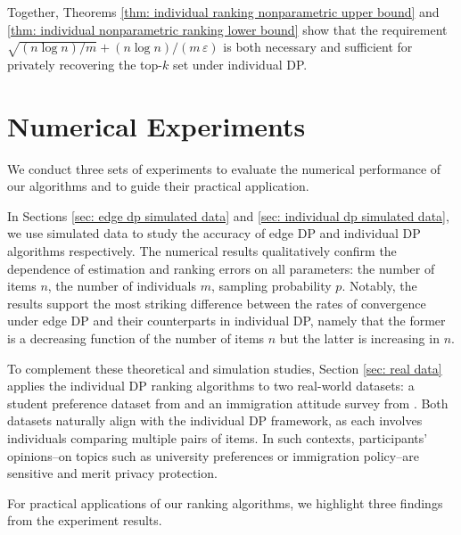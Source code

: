 \documentclass[letterpaper,12pt]{article}
\numberwithin{equation}{section}
\theoremstyle{plain}
\numberwithin{Theorem}{section}
\numberwithin{corollary}{section}
\numberwithin{proposition}{section}
\numberwithin{Lemma}{section}
{
	\theoremstyle{definition}
	\newtheorem{Definition}{Definition}
	\newtheorem{example}{Example}
	\numberwithin{example}{section}
	\newtheorem{fact}{Fact}
	\numberwithin{fact}{section}
	\newtheorem{remark}{Remark}
}
\newcommand{\1}{\mathbbm{1}}
\begin{document}
Together, Theorems \ref{thm: individual ranking nonparametric upper bound} and \ref{thm: individual nonparametric ranking lower bound} show that the requirement 
\(\sqrt{(n\log n)/m}+(n\log n)/(m\,\varepsilon)\)
is both necessary and sufficient for privately recovering the top-\(k\) set under individual DP. 
\vspace{-5mm}
\section{Numerical Experiments}
\label{sec: experiments}

We conduct three sets of experiments to evaluate the numerical performance of our algorithms and to guide their practical application.

In Sections \ref{sec: edge dp simulated data} and \ref{sec: individual dp simulated data}, we use simulated data to study the accuracy of edge DP and individual DP algorithms respectively. The numerical results qualitatively confirm the dependence of estimation and ranking errors on all parameters: the number of items $n$, the number of individuals $m$,  sampling probability $p$. Notably, the results support the most striking difference between the rates of convergence under edge DP and their counterparts in individual DP, namely that the former is a decreasing function of the number of items $n$ but the latter is increasing in $n$.

To complement these theoretical and simulation studies, Section \ref{sec: real data} applies the individual DP ranking algorithms to two real-world datasets: a student preference dataset from \cite{dittrich1998modelling} and an immigration attitude survey from \cite{weber2011novel}. Both datasets naturally align with the individual DP framework, as each involves individuals comparing multiple pairs of items. In such contexts, participants' opinions--on topics such as university preferences or immigration policy--are sensitive and merit privacy protection.

For practical applications of our ranking algorithms, we highlight three findings from the experiment results.
\end{document}
